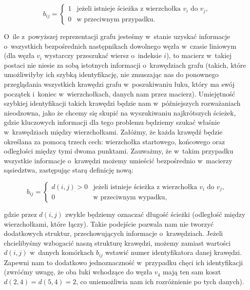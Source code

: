 \begin{equation}
	b_{ij}= \left\{ 
	\begin{array}{ll}
	1 & \textrm{jeżeli istnieje ścieżka z~wierzchołka $v_{i}$ do $v_{j}$,}\\
	0 & \textrm{w przeciwnym przypadku.}
	\end{array} \right.
\end{equation}


O~ile z~powyższej reprezentacji grafu jesteśmy w~stanie uzyskać informacje o~wszystkich bezpośrednich następnikach dowolnego węzła w~czasie liniowym (dla węzła $v_{i}$ wystarczy przeszukać wiersz o~indeksie $i$), to macierz w~takiej postaci nie niesie za sobą istotnych informacji o~krawędziach grafu (takich, które umożliwiłyby ich szybką identyfikację, nie zmuszając nas do ponownego przeglądania wszystkich krawędzi grafu w~poszukiwaniu łuku, który ma swój początek i~koniec w~wierzchołkach, danych nam przez macierz). Umiejętność szybkiej identyfikacji takich krawędzi będzie nam w~późniejszych rozważaniach nieodzowna, jako że chcemy się skupić na wyszukiwaniu najkrótszych ścieżek, gdzie kluczowych informacji dla tego problemu będziemy szukać właśnie w~krawędziach między wierzchołkami. Załóżmy, że każda krawędź będzie określana za pomocą trzech cech: wierzchołka startowego, końcowego oraz odległości między tymi dwoma punktami. Zauważmy, że w~takim przypadku wszystkie informacje o~krawędzi możemy umieścić bezpośrednio w~macierzy sąsiedztwa, zastępując starą definicję nową: 

\begin{savenotes}
	\begin{equation}
		b_{ij}= \left\{ 
		\begin{array}{ll}
		 d \left( i, j \right) > 0  & \textrm{jeżeli istnieje ścieżka z wierzchołka $v_{i}$ do $v_{j}$,}\\
		0 & \textrm{w przeciwnym wypadku,}
		\end{array} \right.
	\end{equation}
\end{savenotes}
gdzie przez $ d \left( i,j \right) $ zwykle będziemy oznaczać długość ścieżki (odległość między wierzchołkami, które łączy). Takie podejście pozwala nam nie tworzyć dodatkowych struktur, przechowujących informacje o~krawędziach. Jeżeli chcielibyśmy wzbogacić naszą strukturę krawędzi, możemy zamiast wartości $d \left( i,j \right)$ w~danych komórkach $b_{ij}$ wstawić numer identyfikatora danej krawędzi. Zapewni nam to dodatkowo jednoznaczność w~przypadku chęci ich identyfikacji (zwróćmy uwagę, że oba łuki wchodzące do węzła $v_{4}$ mają ten sam koszt $ d \left( 2, 4 \right) = d \left( 5, 4 \right) = 2$, co uniemożliwia nam ich rozróżnienie po tych danych).

